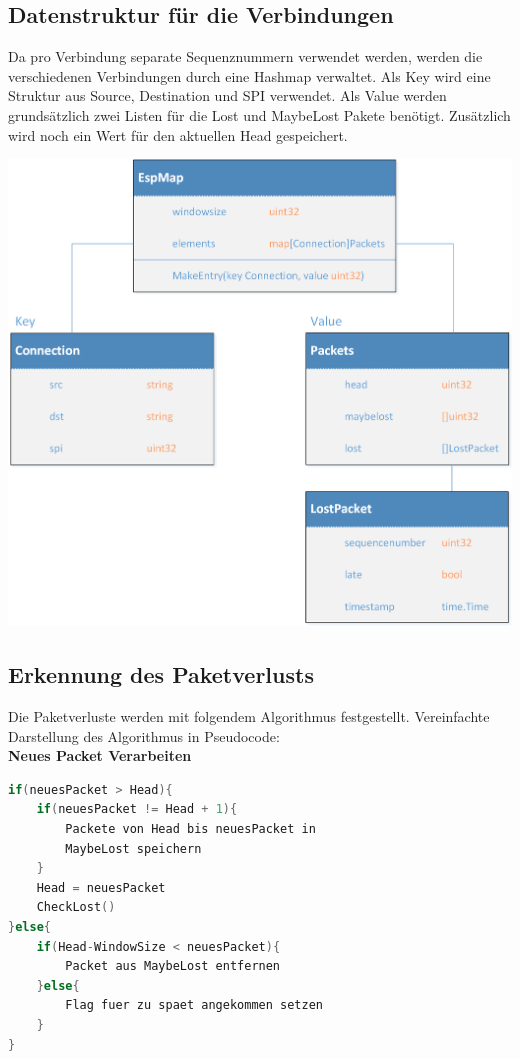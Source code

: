 \subsection{Datenstruktur für die \esp Verbindungen}
Da pro Verbindung separate Sequenznummern verwendet werden, werden die verschiedenen Verbindungen durch eine Hashmap verwaltet. Als Key wird eine Struktur aus Source, Destination und \acs{SPI} verwendet. Als Value werden grundsätzlich zwei Listen für die Lost und MaybeLost Pakete benötigt. Zusätzlich wird noch ein Wert für den aktuellen Head gespeichert.

\includegraphics[width=1\textwidth]{start/img/Datenstruktur.png}

\subsection{Erkennung des Paketverlusts}
Die Paketverluste werden mit folgendem Algorithmus festgestellt.
Vereinfachte Darstellung des Algorithmus in Pseudocode:
\\
\textbf{Neues Packet Verarbeiten}
\begin{lstlisting}[language=go]
if(neuesPacket > Head){
	if(neuesPacket != Head + 1){
		Packete von Head bis neuesPacket in 
		MaybeLost speichern
	}
	Head = neuesPacket
	CheckLost()
}else{
	if(Head-WindowSize < neuesPacket){
		Packet aus MaybeLost entfernen
	}else{
		Flag fuer zu spaet angekommen setzen	
	}
}
\end{lstlisting}


